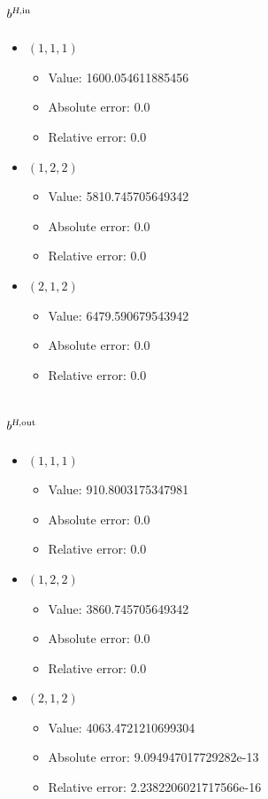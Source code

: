\documentclass{article}%
\begin{document}
\subsection{$b^{\textsl{H},\text{in}}$}%
\begin{itemize}%
	\item $(1, 1, 1)$%
	\begin{itemize}%
		\item Value: 1600.054611885456%
		\item Absolute error: 0.0%
		\item Relative error: 0.0%
	\end{itemize}%
	\item $(1, 2, 2)$%
	\begin{itemize}%
		\item Value: 5810.745705649342%
		\item Absolute error: 0.0%
		\item Relative error: 0.0%
	\end{itemize}%
	\item $(2, 1, 2)$%
	\begin{itemize}%
		\item Value: 6479.590679543942%
		\item Absolute error: 0.0%
		\item Relative error: 0.0%
	\end{itemize}%
\end{itemize}%
\subsection{$b^{\textsl{H},\text{out}}$}%
\begin{itemize}%
	\item $(1, 1, 1)$%
	\begin{itemize}%
		\item Value: 910.8003175347981%
		\item Absolute error: 0.0%
		\item Relative error: 0.0%
	\end{itemize}%
	\item $(1, 2, 2)$%
	\begin{itemize}%
		\item Value: 3860.745705649342%
		\item Absolute error: 0.0%
		\item Relative error: 0.0%
	\end{itemize}%
	\item $(2, 1, 2)$%
	\begin{itemize}%
		\item Value: 4063.4721210699304%
		\item Absolute error: 9.094947017729282e-13%
		\item Relative error: 2.2382206021717566e-16%
	\end{itemize}%
\end{itemize}%
\end{document}
